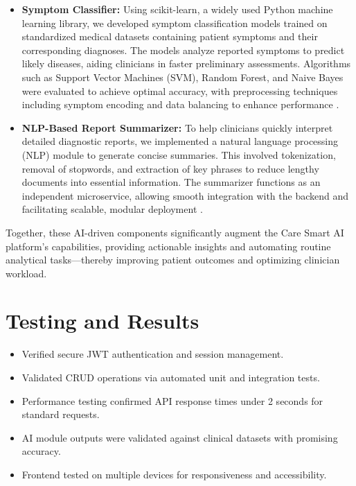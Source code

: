 \documentclass[conference]{IEEEtran}
\begin{document}
\begin{itemize}
    \item \textbf{Symptom Classifier:} Using scikit-learn, a widely used Python machine learning library, we developed symptom classification models trained on standardized medical datasets containing patient symptoms and their corresponding diagnoses. The models analyze reported symptoms to predict likely diseases, aiding clinicians in faster preliminary assessments. Algorithms such as Support Vector Machines (SVM), Random Forest, and Naive Bayes were evaluated to achieve optimal accuracy, with preprocessing techniques including symptom encoding and data balancing to enhance performance \cite{web:100,web:105,web:106}.

    \item \textbf{NLP-Based Report Summarizer:} To help clinicians quickly interpret detailed diagnostic reports, we implemented a natural language processing (NLP) module to generate concise summaries. This involved tokenization, removal of stopwords, and extraction of key phrases to reduce lengthy documents into essential information. The summarizer functions as an independent microservice, allowing smooth integration with the backend and facilitating scalable, modular deployment \cite{web:17,web:18}.
\end{itemize}


Together, these AI-driven components significantly augment the Care Smart AI platform’s capabilities, providing actionable insights and automating routine analytical tasks—thereby improving patient outcomes and optimizing clinician workload.


\section{Testing and Results}

\begin{itemize}
    \item Verified secure JWT authentication and session management.
    \item Validated CRUD operations via automated unit and integration tests.
    \item Performance testing confirmed API response times under 2 seconds for standard requests.
    \item AI module outputs were validated against clinical datasets with promising accuracy.
    \item Frontend tested on multiple devices for responsiveness and accessibility.
\end{itemize}
\end{document}

